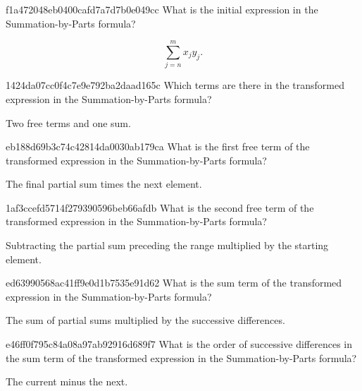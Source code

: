 \begin{note}{f1a472048eb0400cafd7a7d7b0e049cc}
    What is the initial expression in the Summation-by-Parts formula?

    \begin{cloze}{1}
        \[
            \sum_{j=n}^{m} x_j y_j.
        \]
    \end{cloze}
\end{note}

\begin{note}{1424da07cc0f4c7e9e792ba2daad165c}
    Which terms are there in the transformed expression in the Summation-by-Parts formula?

    \begin{cloze}{1}
        Two free terms and one sum.
    \end{cloze}
\end{note}

\begin{note}{eb188d69b3c74c42814da0030ab179ca}
    What is the first free term of the transformed expression in the Summation-by-Parts formula?

    \begin{cloze}{1}
        The final partial sum times the next element.
    \end{cloze}
\end{note}

\begin{note}{1af3ccefd5714f279390596beb66afdb}
    What is the second free term of the transformed expression in the Summation-by-Parts formula?

    \begin{cloze}{1}
        Subtracting the partial sum preceding the range multiplied by the starting element.
    \end{cloze}
\end{note}

\begin{note}{ed63990568ac41ff9e0d1b7535e91d62}
    What is the sum term of the transformed expression in the Summation-by-Parts formula?

    \begin{cloze}{1}
        The sum of partial sums multiplied by the successive differences.
    \end{cloze}
\end{note}

\begin{note}{e46ff0f795c84a08a97ab92916d689f7}
    What is the order of successive differences in the sum term of the transformed expression in the Summation-by-Parts formula?

    \begin{cloze}{1}
        The current minus the next.
    \end{cloze}
\end{note}

